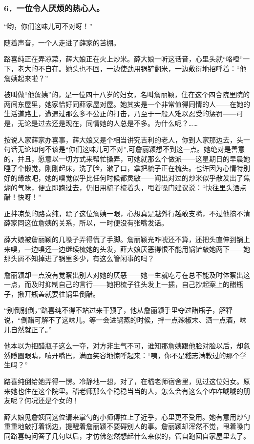 \subsubsection*{6．一位令人厌烦的热心人。}
\par “哟，你们这味儿可不对呀！”
\par 随着声音，一个人走进了薛家的苫棚。
\par 路喜纯正在弄凉菜，薛大娘正在火上炒米。薛大娘一听这话音，心里头就“咯噔”一下，老大的不自在。她头也不回，一边使劲用锅铲翻米，一边敷衍地招呼着：“他詹姨起来啦？”
\par 被叫做“他詹姨”的，是一位四十八岁的妇女，名叫詹丽颖，住在这个四合院里院的两间东屋里，她家恰好同薛家屋对屋。她其实是一个非常值得同情的人——在她的生活道路上，遭遇过那么多不公正的打击，乃至于一般人难以忍受的惩罚——可是，无论是过去还是现在，同情她的人总是不多。为什么呢？……
\par 按说人家薛家办喜事，薛大娘又是个相当讲究吉利的老人，你到人家那边去，头一句话无论如何不该是“你们这味儿可不对”,可詹丽颖想不到这一点。她绝对是善意的，并且，愿意以一切方式来帮忙操弄，可她就那么个做派——这星期日的早晨她睡了个懒觉，刚刚起床，洗了脸，漱了口，拿把梳子正在梳头。也许因为心情特别好的缘故吧，她的嗅觉似乎比任何时候都灵敏——闻出对过的炒米似乎散发出了焦煳的气味，便立即跑过去，仍旧用梳子梳着头，甩着嗓门建议说：“快往里头洒点醋！快呀！”
\par 正拌凉菜的路喜纯，瞟了这位詹姨一眼，心想真是越外行越敢支嘴，不过他搞不清薛家同这位詹姨的关系，所以，一时便没有张嘴发话。
\par 薛大娘被詹丽颖的几嗓子弄得慌了手脚。詹丽颖光咋唬还不算，还把头直伸到锅上来嗅，一边嗅还一边继续梳她的头发，薛大娘厌恶得恨不能用锅铲敲她两下——她那头屑不知掉进了锅里多少，有这么管闲事的吗？
\par 詹丽颖却一点没有觉察出别人对她的厌恶——她一生就吃亏在总不能及时体察出这一点，而及时抑制自己的言行——她把梳子往头发上一插，自己抄起案上的醋瓶子，揪开瓶盖就要往锅里倒醋。
\par “别倒别倒，”路喜纯不得不站过来干预了，他从詹丽颖手里夺过醋瓶子，解释说，“倒醋可解不了这味儿。等一会进锅蒸的时候，拌一点辣椒末、洒一点酒，味儿自然就正了。”
\par 他本以为把醋瓶子这么一夺，对方非生气不可，谁知那詹姨跟他脸对脸以后，却忽然瞪圆眼睛，嘻开嘴巴，满面笑容地惊呼起来：“咦，你不是嵇志满教过的那个学生吗？”
\par 路喜纯倒给她弄得一愣。冷静地一想，对了，在嵇老师宿舍里，见过这位妇女。原来她也住在这个院里。嵇老师那么个稳稳当当的人，怎么会有这么个咋咋唬唬的朋友呢？何况还是个女的！
\par 薛大娘见詹姨同这位请来掌勺的小师傅拉上了近乎，心里更不受用。她有意用炒勺重重地敲打着锅边，提醒着詹丽颖不要碍别人的事。詹丽颖却浑然不觉，甩着嗓门同路喜纯问答了几句以后，才仿佛忽然想起什么来似的，管自跑回自家屋里去了。
